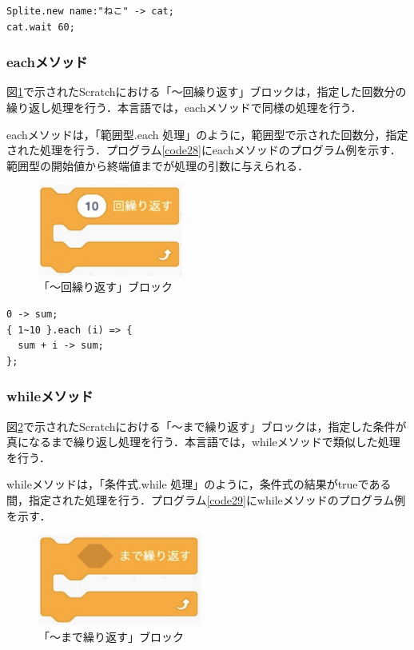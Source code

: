 \documentclass[10pt,a4j]{ltjsarticle}
\begin{document}
\begin{lstlisting}[caption=waitメソッドのプログラム例, label=code27]
Splite.new name:"ねこ" -> cat;
cat.wait 60;
\end{lstlisting}

\subsubsection{eachメソッド}
図\ref{fig:each}で示されたScratchにおける「〜回繰り返す」ブロックは，指定した回数分の繰り返し処理を行う．本言語では，eachメソッドで同様の処理を行う．

eachメソッドは，「範囲型.each 処理」のように，範囲型で示された回数分，指定された処理を行う．プログラム\ref{code28}にeachメソッドのプログラム例を示す．範囲型の開始値から終端値までが処理の引数に与えられる．

\begin{figure}[H]
  \centering
  \includegraphics[height=30mm]{images/each.pdf} 
  \caption{「〜回繰り返す」ブロック}
  \label{fig:each}
\end{figure}

\begin{lstlisting}[caption=eachメソッドのプログラム例, label=code28]
0 -> sum;
{ 1~10 }.each (i) => {
  sum + i -> sum;
};
\end{lstlisting}
\subsubsection{whileメソッド}
図\ref{fig:while}で示されたScratchにおける「〜まで繰り返す」ブロックは，指定した条件が真になるまで繰り返し処理を行う．本言語では，whileメソッドで類似した処理を行う．

whileメソッドは，「条件式.while 処理」のように，条件式の結果がtrueである間，指定された処理を行う．プログラム\ref{code29}にwhileメソッドのプログラム例を示す．

\begin{figure}[H]
  \centering
  \includegraphics[height=30mm]{images/while.pdf} 
  \caption{「〜まで繰り返す」ブロック}
  \label{fig:while}
\end{figure}
\end{document}
